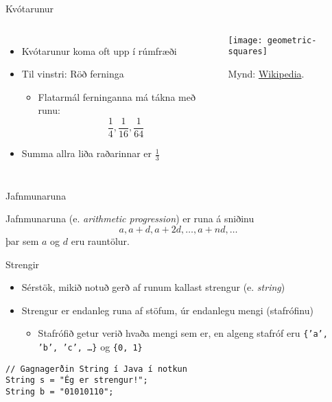 \documentclass[handout]{beamer}
\begin{document}
\begin{frame}{Kvótarunur}
    \begin{columns}
        \begin{itemize}
            \item Kvótarunur koma oft upp í rúmfræði
            \item Til vinstri: Röð ferninga
            \begin{itemize}
                \item Flatarmál ferninganna má tákna með runu:
                \[
                    \frac{1}{4}, \frac{1}{16}, \frac{1}{64}
                \] 
            \end{itemize}
            \item Summa allra liða raðarinnar er $\frac{1}{3}$
        \end{itemize}
        \begin{center}
            \texttt{[image: geometric-squares]}

            Mynd: \href{https://en.wikipedia.org/wiki/File:GeometricSquares.svg}{Wikipedia}.
        \end{center}
    \end{columns}
\end{frame}

\begin{frame}{Jafnmunaruna}
    \begin{tcolorbox}[title=Jafnmunaruna]
        Jafnmunaruna (e. \emph{arithmetic progression}) er runa á sniðinu
        \[
            a, a+d, a+2d, \ldots, a + nd, \ldots
        \]
        þar sem $a$ og $d$ eru rauntölur.
    \end{tcolorbox}
\end{frame}

\begin{frame}[fragile]{Strengir}
\begin{itemize}
 \item Sérstök, mikið notuð gerð af runum kallast strengur (e. \emph{string})
 \item Strengur er endanleg runa af stöfum, úr endanlegu mengi (stafrófinu)
 \begin{itemize}
  \item Stafrófið getur verið hvaða mengi sem er, en algeng stafróf eru \texttt{\{'a', 'b', 'c', \ldots\}} og \texttt{\{0, 1\}}
 \end{itemize}
\end{itemize}

\begin{verbatim}
// Gagnagerðin String í Java í notkun
String s = "Ég er strengur!";
String b = "01010110";
\end{verbatim}
\end{frame}
\end{document}
